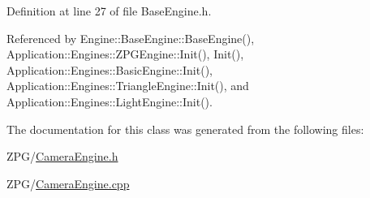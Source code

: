 Definition at line 27 of file Base\+Engine.\+h.



Referenced by Engine\+::\+Base\+Engine\+::\+Base\+Engine(), Application\+::\+Engines\+::\+Z\+P\+G\+Engine\+::\+Init(), Init(), Application\+::\+Engines\+::\+Basic\+Engine\+::\+Init(), Application\+::\+Engines\+::\+Triangle\+Engine\+::\+Init(), and Application\+::\+Engines\+::\+Light\+Engine\+::\+Init().



The documentation for this class was generated from the following files\+:\begin{DoxyCompactItemize}
\item 
Z\+P\+G/\mbox{\hyperlink{CameraEngine_8h}{Camera\+Engine.\+h}}\item 
Z\+P\+G/\mbox{\hyperlink{CameraEngine_8cpp}{Camera\+Engine.\+cpp}}\end{DoxyCompactItemize}
